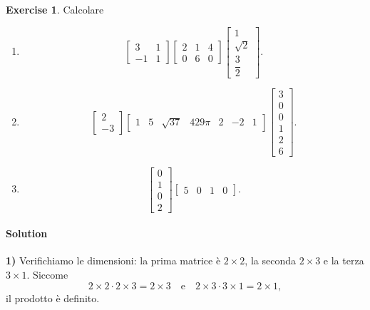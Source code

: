 \documentclass{article}
\theoremstyle{plain}
\theoremstyle{definition}
\newtheorem{xca}[exmp]{Exercise}
\theoremstyle{remark}
\begin{document}
\begin{bxthm}
\begin{xca}
    Calcolare
    \begin{enumerate}
        \item 
        \[
        \begin{bmatrix}
            3 & 1 \\
            -1 & 1
        \end{bmatrix}
        \begin{bmatrix}
            2 & 1 & 4 \\
            0 & 6 & 0
        \end{bmatrix}
        \begin{bmatrix}
            1 \\
            \sqrt{2} \\
            \dfrac{3}{2}
        \end{bmatrix}.
        \]
        \item 
        \[
        \begin{bmatrix}
            2 \\
            -3
        \end{bmatrix}
        \begin{bmatrix}
            1 & 5 & \sqrt{37} & 429\pi & 2 & -2 & 1
        \end{bmatrix}
        \begin{bmatrix}
            3 \\
            0 \\
            0 \\
            1 \\
            2 \\
            6
        \end{bmatrix}.
        \]
        \item 
        \[
        \begin{bmatrix}
            0 \\
            1 \\
            0 \\
            2
        \end{bmatrix}
        \begin{bmatrix}
            5 & 0 & 1 & 0
        \end{bmatrix}.
        \]
    \end{enumerate}
\end{xca}
\end{bxthm}
\paragraph{Solution}
\textbf{1)} 
Verifichiamo le dimensioni: la prima matrice è $2\times2$, la seconda $2\times3$ e la terza $3\times1$. Siccome
\[
2\times2\cdot2\times3=2\times3\quad\text{e}\quad2\times3\cdot3\times1=2\times1,
\]
il prodotto è definito.
\end{document}

